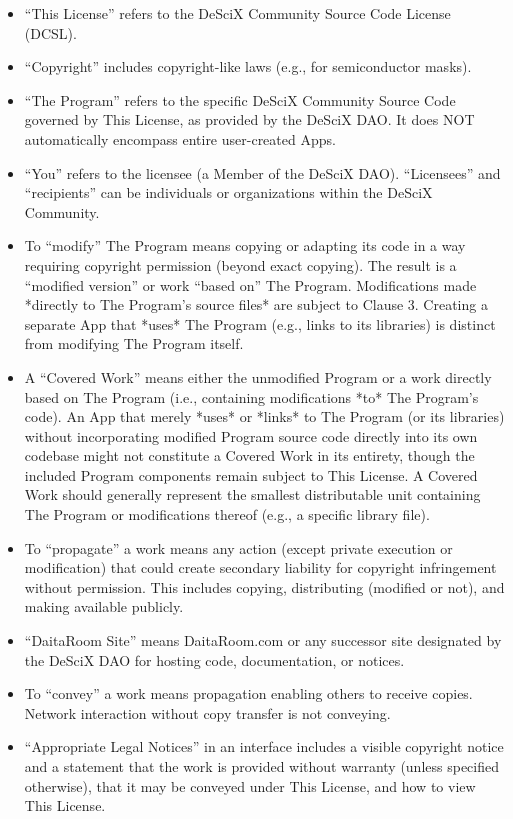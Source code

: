 \documentclass{article}
\begin{document}
\begin{itemize}
    \item “This License” refers to the DeSciX Community Source Code License (DCSL).
    \item “Copyright” includes copyright-like laws (e.g., for semiconductor masks).
    \item “The Program” refers to the specific DeSciX Community Source Code governed by This License, as provided by the DeSciX DAO. It does NOT automatically encompass entire user-created Apps.
    \item “You” refers to the licensee (a Member of the DeSciX DAO). “Licensees” and “recipients” can be individuals or organizations within the DeSciX Community.
    \item To “modify” The Program means copying or adapting its code in a way requiring copyright permission (beyond exact copying). The result is a “modified version” or work “based on” The Program. Modifications made *directly to The Program's source files* are subject to Clause 3. Creating a separate App that *uses* The Program (e.g., links to its libraries) is distinct from modifying The Program itself.
    \item A “Covered Work” means either the unmodified Program or a work directly based on The Program (i.e., containing modifications *to* The Program's code). An App that merely *uses* or *links* to The Program (or its libraries) without incorporating modified Program source code directly into its own codebase might not constitute a Covered Work in its entirety, though the included Program components remain subject to This License. A Covered Work should generally represent the smallest distributable unit containing The Program or modifications thereof (e.g., a specific library file).
    \item To “propagate” a work means any action (except private execution or modification) that could create secondary liability for copyright infringement without permission. This includes copying, distributing (modified or not), and making available publicly.
    \item “DaitaRoom Site” means DaitaRoom.com or any successor site designated by the DeSciX DAO for hosting code, documentation, or notices.
    \item To “convey” a work means propagation enabling others to receive copies. Network interaction without copy transfer is not conveying.
    \item “Appropriate Legal Notices” in an interface includes a visible copyright notice and a statement that the work is provided without warranty (unless specified otherwise), that it may be conveyed under This License, and how to view This License.

\end{itemize}
\end{document}
